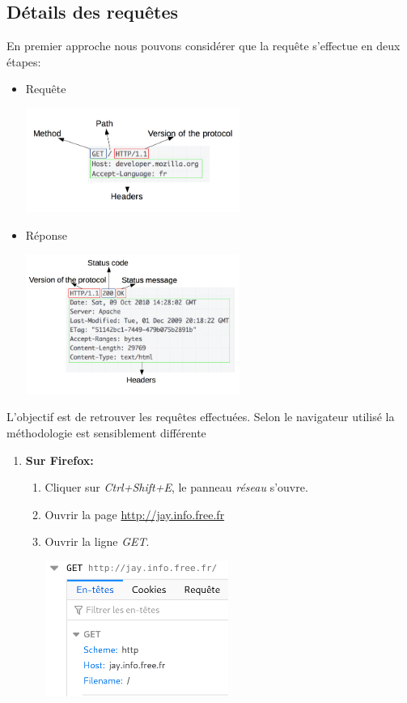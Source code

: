 \documentclass[a4paper,11pt]{article}
\begin{document}
\begin{Form}
\subsection{Détails des requêtes}
En premier approche nous pouvons considérer que la requête s'effectue en deux étapes:
\begin{itemize}
\item Requête \begin{center}
\centering
\includegraphics[width=7cm]{ressources/HTTP_Request.png}
\label{demande}
\end{center}
\item Réponse \begin{center}
\centering
\includegraphics[width=7cm]{ressources/HTTP_Response.png}
\label{demande}
\end{center}
\end{itemize}
\begin{activite} L'objectif est de retrouver les requêtes effectuées. Selon le navigateur utilisé la méthodologie est sensiblement différente
\begin{enumerate}
\item \textbf{Sur Firefox:}
\begin{enumerate}
\item  Cliquer sur \emph{Ctrl+Shift+E}, le panneau \emph{réseau} s'ouvre.
\item Ouvrir la page \mbox{\url{http://jay.info.free.fr}}
\item Ouvrir la ligne \emph{GET}.
\begin{center}
\includegraphics[width=6cm]{ressources/requete-ff.png}

\end{center}
\end{enumerate}
\end{enumerate}
\end{activite}
\end{Form}
\end{document}
